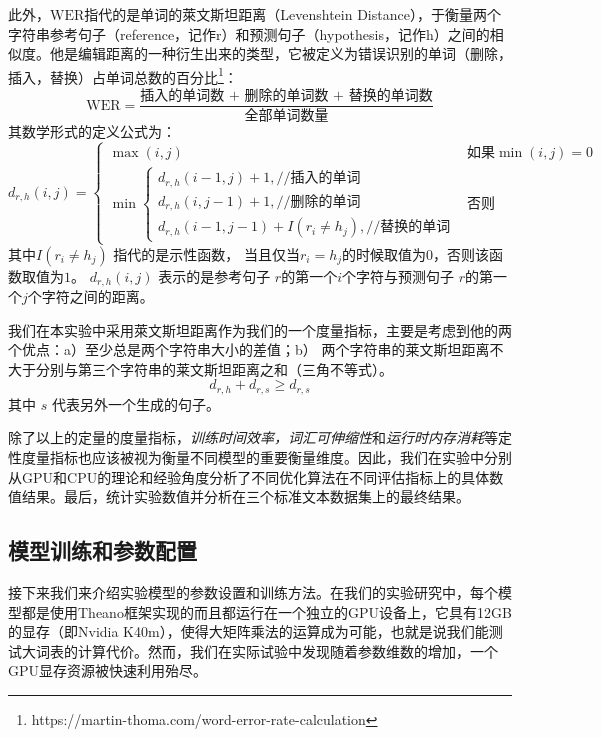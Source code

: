 此外，$\mathrm{WER}$指代的是单词的萊文斯坦距离（Levenshtein Distance），于衡量两个字符串参考句子（reference，记作r）和预测句子（hypothesis，记作h）之间的相似度。他是编辑距离的一种衍生出来的类型，它被定义为错误识别的单词（删除，插入，替换）占单词总数的百分比\footnote{https://martin-thoma.com/word-error-rate-calculation}：
\begin{equation}\label{equ:wer}
  \mathrm{WER} = \frac{\text{插入的单词数 + 删除的单词数 + 替换的单词数}}{\text{全部单词数量}}
\end{equation}
其数学形式的定义公式为：
\begin{equation}\label{equ:distance}
d_{r,h}(i,j) =  \begin{cases}
\max (i,j)& \text{如果}\min(i,j)=0\\
\min  \begin{cases}
d_{r,h}(i - 1,j) + 1,\text{//插入的单词}\\
d_{r,h}(i,j - 1) + 1,\text{//删除的单词}\\
d_{r,h}(i - 1,j - 1) + I{(r_i\neq h_j)},\text{//替换的单词}
\end{cases} &\text{否则}
\end{cases}
\end{equation}
其中$I{(r_i\neq h_j)}$ 指代的是示性函数， 当且仅当$r_i= h_j$的时候取值为$0$，否则该函数取值为$1$。 $d_{r,h}(i,j)$ 表示的是参考句子 $r$的第一个$i$个字符与预测句子 $r$的第一个$j$个字符之间的距离。

我们在本实验中采用萊文斯坦距离作为我们的一个度量指标，主要是考虑到他的两个优点：a）至少总是两个字符串大小的差值；b） 两个字符串的莱文斯坦距离不大于分别与第三个字符串的莱文斯坦距离之和（三角不等式）。
\begin{equation}
d_{r,h}+d_{r,s}\ge d_{r,s}
\end{equation}
其中 $s$ 代表另外一个生成的句子。

除了以上的定量的度量指标，\textit{训练时间效率，词汇可伸缩性}和\textit{运行时内存消耗}等定性度量指标也应该被视为衡量不同模型的重要衡量维度。因此，我们在实验中分别从GPU和CPU的理论和经验角度分析了不同优化算法在不同评估指标上的具体数值结果。最后，统计实验数值并分析在三个标准文本数据集上的最终结果。

\subsection{模型训练和参数配置}
接下来我们来介绍实验模型的参数设置和训练方法。在我们的实验研究中，每个模型都是使用Theano框架实现的而且都运行在一个独立的GPU设备上，它具有12GB的显存（即Nvidia K40m），使得大矩阵乘法的运算成为可能，也就是说我们能测试大词表的计算代价。然而，我们在实际试验中发现随着参数维数的增加，一个GPU显存资源被快速利用殆尽。

